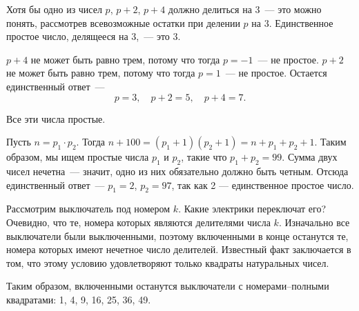 ﻿
\begin{itemize}

\itA Хотя бы одно из чисел $p$, $p+2$, $p+4$ должно делиться на 3~— это можно понять, рассмотрев всевозможные остатки при делении $p$ на 3. Единственное простое число, делящееся на 3,~— это 3.

$p+4$ не может быть равно трем, потому что тогда $p=-1$~— не простое. $p+2$ не может быть равно трем, потому что тогда $p=1$~— не простое. Остается единственный ответ~—
	$$p=3,\quad p+2 = 5,\quad p+4 = 7.$$

Все эти числа простые.

\itB Пусть $n = p_1 \cdot p_2$. Тогда $n+100 = (p_1 + 1)(p_2 + 1) = n + p_1 + p_2 + 1$. Таким образом, мы ищем простые числа $p_1$ и $p_2$, такие что $p_1 + p_2 = 99$. Сумма двух чисел нечетна~— значит, одно из них обязательно должно быть четным. Отсюда единственный ответ~— $p_1 = 2$, $p_2 = 97$, так как 2 — единственное простое число.

\itC Рассмотрим выключатель под номером $k$. Какие электрики переключат его? Очевидно, что те, номера которых являются делителями числа $k$. Изначально все выключатели были выключенными, поэтому включенными в конце останутся те, номера которых имеют нечетное число делителей. Известный факт заключается в том, что этому условию удовлетворяют только квадраты натуральных чисел.

Таким образом, включенными останутся выключатели с номерами–полными квадратами: 1, 4, 9, 16, 25, 36, 49.
\end{itemize}